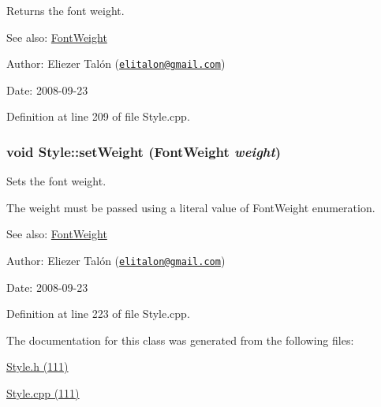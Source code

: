 Returns the font weight. 

\begin{Desc}
\item[See also:]\hyperlink{_font_weight_8h_ecff23ba4a68486421bcea57e095fe66}{FontWeight}\end{Desc}
\begin{Desc}
\item[Author:]Eliezer Talón (\href{mailto:elitalon@gmail.com}{\tt elitalon@gmail.com}) \end{Desc}
\begin{Desc}
\item[Date:]2008-09-23 \end{Desc}


Definition at line 209 of file Style.cpp.\hypertarget{class_style_3bb5ced743176c5a68479d506f348350}{
\subsubsection[setWeight]{\setlength{\rightskip}{0pt plus 5cm}void Style::setWeight ({\bf FontWeight} {\em weight})}}
\label{class_style_3bb5ced743176c5a68479d506f348350}


Sets the font weight. 

The weight must be passed using a literal value of FontWeight enumeration.

\begin{Desc}
\item[See also:]\hyperlink{_font_weight_8h_ecff23ba4a68486421bcea57e095fe66}{FontWeight}\end{Desc}
\begin{Desc}
\item[Author:]Eliezer Talón (\href{mailto:elitalon@gmail.com}{\tt elitalon@gmail.com}) \end{Desc}
\begin{Desc}
\item[Date:]2008-09-23 \end{Desc}


Definition at line 223 of file Style.cpp.

The documentation for this class was generated from the following files:\begin{CompactItemize}
\item 
\hyperlink{_style_8h}{Style.h (111)}\item 
\hyperlink{_style_8cpp}{Style.cpp (111)}\end{CompactItemize}
